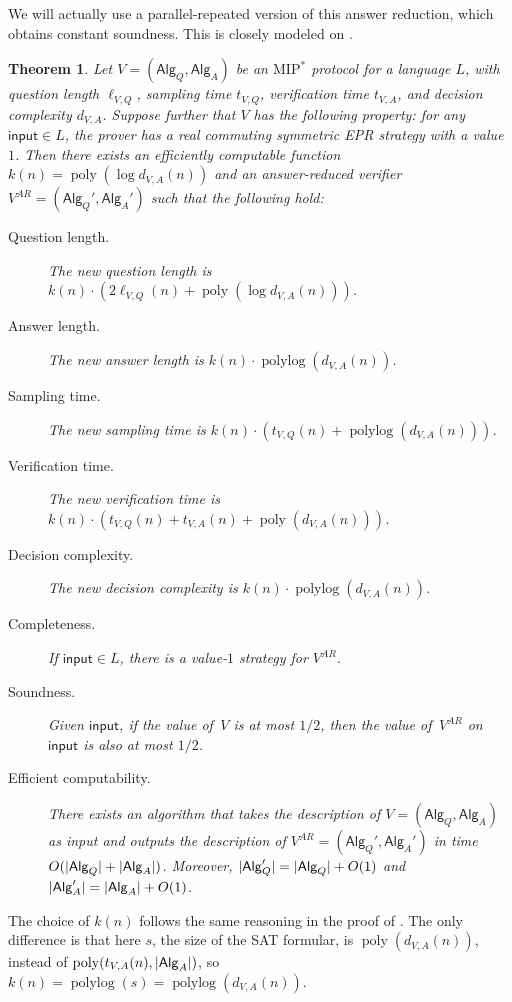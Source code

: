 \documentclass[10pt,a4paper]{article}
\theoremstyle{plain}
\newtheorem{theorem}{Theorem}[section]
\theoremstyle{definition}
\DeclarePairedDelimiter{\abs}{\lvert}{\rvert}
\newcommand{\poly} {\ensuremath{\operatorname{poly}}}
\newcommand{\polylog} {\ensuremath{\operatorname{polylog}}}
\newcommand{\1}{\mathbb{1}} %
\newcommand{\ipt}{\mathsf{input}}
\newcommand{\Alg}{\mathsf{Alg}}
\newcommand{\MIP}{\mathrm{MIP}}
\begin{document}
We will actually use a parallel-repeated version of this answer reduction, which obtains constant soundness. This is closely modeled on \cite[Theorem 52]{10.1145/3564246.3585208}.
\begin{theorem}
\label{thm:newar-pr}
    Let $V = (\Alg_Q, \Alg_A)$ be an $\MIP^*$ protocol for a language $L$, with question length $\ell_{V,Q}$, sampling time $t_{V,Q}$, verification time $t_{V,A}$, and decision complexity $d_{V,A}$. 
    Suppose further that $V$ has the following property: for any $\ipt \in L$, the prover has a 
	real commuting symmetric EPR strategy with a value $1$.
    Then there exists an efficiently computable function $k(n) = \poly(\log d_{V,A}(n))$ and an answer-reduced verifier $V^{AR} = (\Alg_Q', \Alg_A')$
    such that the following hold:
    \begin{description}
        \item[Question length.] The new question length is $k(n) \cdot (2\ell_{V,Q}(n) + \poly(\log d_{V,A}(n)))$.
        \item[Answer length.] The new answer length is $k(n) \cdot \polylog( d_{V,A}(n))$.
        \item[Sampling time.] The new sampling time is $k(n) \cdot (t_{V,Q}(n) +\polylog (d_{V,A}(n)))$.
        \item[Verification time.] The new verification time is $k(n) \cdot (t_{V,Q}(n) + t_{V,A}(n)+ \poly(d_{V,A}(n)))$. 
        \item[Decision complexity.] The new decision complexity is $k(n) \cdot \polylog(d_{V,A}(n))$.
        \item[Completeness.] If $\ipt \in L$, there is a value-$1$ strategy for $V^{AR}$.
        \item[Soundness.] Given $\ipt$, if the value of $\,V$ is at most $1/2$, then the value of $\,V^{AR}$ on $\ipt$ is also at most $1/2$.
        \item[Efficient computability.] There exists an algorithm that takes the description of $V = (\Alg_Q, \Alg_A)$ as input and outputs the description of $V^{AR} = (\Alg_Q', \Alg_A')$ in time $O( \abs{\Alg_Q}+ \abs{\Alg_A})$.
        Moreover, $\abs{\Alg_Q'} = \abs{\Alg_Q} +O(1)$ and $\abs{\Alg_A'} = \abs{\Alg_A}+O(1)$.
    \end{description}
\end{theorem}
The choice of $k(n)$ follows the same reasoning in the proof of \cite[Theorem 52]{10.1145/3564246.3585208}. 
The only difference is that here $s$, the size of the SAT formular, is $\poly(d_{V,A}(n))$, instead of $\poly(t_{V,A}(n), \abs{\Alg_A})$, so $k(n) = \polylog(s) = \polylog(d_{V,A}(n))$.
\end{document}

